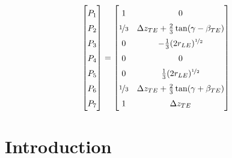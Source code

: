 	
	\begin{equation}
	\renewcommand\arraystretch{1.5}
	\begin{bmatrix}
	P_1 \\ 
	P_2 \\
	P_3 \\
	P_4 \\
	P_5 \\
	P_6 \\
	P_7
	\end{bmatrix}
	=
	\begin{bmatrix}
	1 & 0 \\ 
	\nicefrac{1}{3} & \Delta z_{TE}+\frac{2}{3}\tan(\gamma-\beta_{TE})  \\ 
	0 & -\frac{1}{3}(2r_{LE})^{\nicefrac{1}{2}} \\
	0 & 0 \\
	0 & \frac{1}{3} (2r_{LE})^{\nicefrac{1}{2}}\\
	\nicefrac{1}{3} & \Delta z_{TE}+\frac{2}{3}\tan(\gamma+\beta_{TE}) \\
	1 & \Delta z_{TE}
	\end{bmatrix} 
	\end{equation}
	
	
	
	\section{Introduction}
	
	
	
	
	\bigskip
	
	 
	{}
	
	
